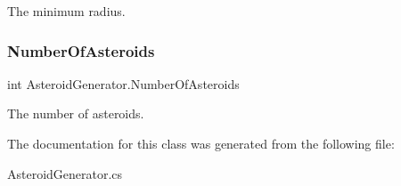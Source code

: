 The minimum radius. 

\mbox{\label{class_asteroid_generator_a4cc51b71a8eb59ad4fa0a58b1ab2fdbc}} 
\subsubsection{\texorpdfstring{Number\+Of\+Asteroids}{NumberOfAsteroids}}
{\footnotesize\ttfamily int Asteroid\+Generator.\+Number\+Of\+Asteroids}



The number of asteroids. 



The documentation for this class was generated from the following file\+:\begin{DoxyCompactItemize}
\item 
Asteroid\+Generator.\+cs\end{DoxyCompactItemize}

